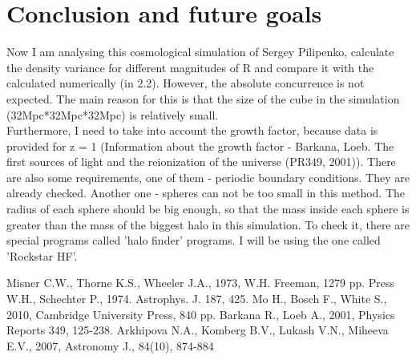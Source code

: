 \documentclass[11pt]{article}
\begin{document}
\section{Conclusion and future goals}
Now I am analysing this cosmological simulation of Sergey Pilipenko, calculate the density variance for different magnitudes of R and compare it with the calculated numerically (in 2.2). However, the absolute concurrence is not expected. The main reason for this is that the size of the cube in the simulation (32Mpc*32Mpc*32Mpc) is relatively small.\\ Furthermore, I need to take into account the growth factor, because data is provided for z = 1 (Information about the growth factor - Barkana, Loeb. The first sources of light and the reionization of the universe (PR349, 2001)). There are also some requirements, one of them - periodic boundary conditions. They are already checked. Another one - spheres can not be too small in this method. The radius of each sphere should be big enough, so that the mass inside each sphere is greater than the mass of the biggest halo in this simulation. To check it, there are special programs called 'halo finder' programs. I will be using the one called 'Rockstar HF'.

\begin{thebibliography}{9}
Misner C.W., Thorne K.S., Wheeler J.A., 1973, W.H. Freeman, 1279 pp.
Press W.H., Schechter P., 1974. Astrophys. J. 187, 425.
Mo H., Bosch F., White S., 2010, Cambridge University Press, 840 pp.
Barkana R., Loeb A., 2001, Physics Reports 349, 125-238.
Arkhipova N.A., Komberg B.V., Lukash V.N., Miheeva E.V., 2007, Astronomy J., 84(10), 874-884
\end{thebibliography}
\end{document}
